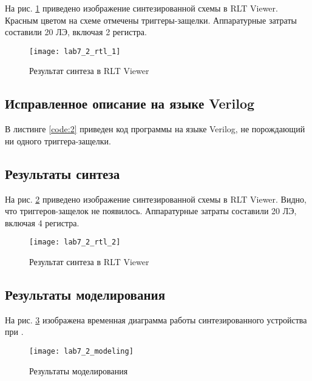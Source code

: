 На рис. \ref{fig:lab7_2_rtl_1} приведено изображение синтезированной схемы в RLT Viewer. Красным цветом на схеме отмечены триггеры-защелки. Аппаратурные затраты составили 20 ЛЭ, включая 2 регистра.
\begin{figure}[H]
\begin{center}
	\texttt{[image: lab7\_2\_rtl\_1]}
	\caption{Результат синтеза в RLT Viewer}
	\label{fig:lab7_2_rtl_1}
\end{center}
\end{figure}

\subsection{Исправленное описание на языке Verilog}

В листинге \ref{code:2} приведен код программы на языке Verilog, не порождающий ни одного триггера-защелки.



\newpage

\subsection{Результаты синтеза}

На рис. \ref{fig:lab7_2_rtl} приведено изображение синтезированной схемы в RLT Viewer. Видно, что триггеров-защелок не появилось. Аппаратурные затраты составили 20 ЛЭ, включая 4 регистра.

\begin{figure}[H]
\begin{center}
	\texttt{[image: lab7\_2\_rtl\_2]}
	\caption{Результат синтеза в RLT Viewer}
	\label{fig:lab7_2_rtl}
\end{center}
\end{figure}

\newpage

\subsection{Результаты моделирования}
\label{sec:lab7_2_modeling}

На рис. \ref{fig:lab7_2_modeling} изображена временная диаграмма работы синтезированного устройства при .

\begin{figure}[H]
\begin{center}
	\texttt{[image: lab7\_2\_modeling]}
	\caption{Результаты моделирования}
	\label{fig:lab7_2_modeling}
\end{center}
\end{figure}


